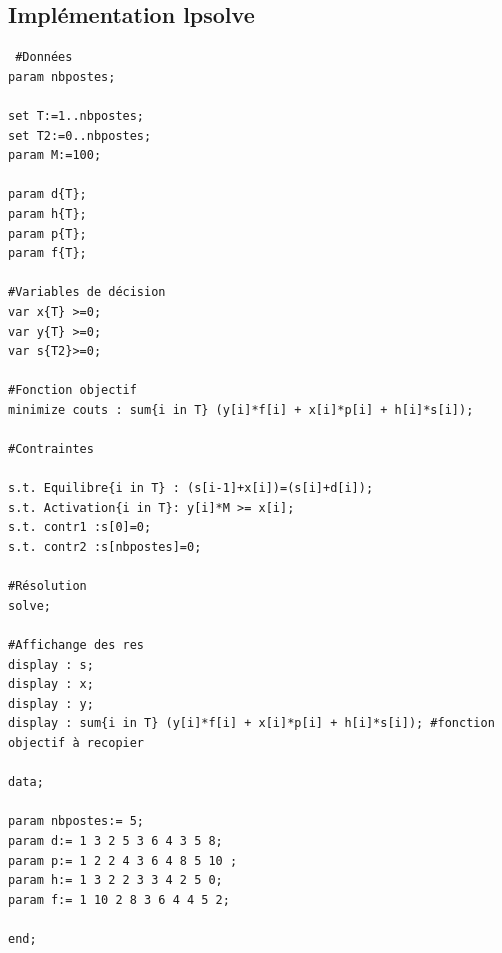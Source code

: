 \documentclass[a4paper,11pt,twoside]{report}
\begin{document}
\begin{appendices}
\chapter{Implémentation lpsolve}
\label{implementationlpsolve}
\begin{verbatim}
 #Données
param nbpostes;

set T:=1..nbpostes;
set T2:=0..nbpostes;
param M:=100;

param d{T};
param h{T};
param p{T};
param f{T};

#Variables de décision
var x{T} >=0;
var y{T} >=0;
var s{T2}>=0;

#Fonction objectif
minimize couts : sum{i in T} (y[i]*f[i] + x[i]*p[i] + h[i]*s[i]);

#Contraintes

s.t. Equilibre{i in T} : (s[i-1]+x[i])=(s[i]+d[i]);
s.t. Activation{i in T}: y[i]*M >= x[i];
s.t. contr1 :s[0]=0;
s.t. contr2 :s[nbpostes]=0;

#Résolution
solve;

#Affichange des res
display : s;
display : x;
display : y;
display : sum{i in T} (y[i]*f[i] + x[i]*p[i] + h[i]*s[i]); #fonction objectif à recopier

data;

param nbpostes:= 5;
param d:= 1 3 2 5 3 6 4 3 5 8;
param p:= 1 2 2 4 3 6 4 8 5 10 ;
param h:= 1 3 2 2 3 3 4 2 5 0;
param f:= 1 10 2 8 3 6 4 4 5 2;

end;
\end{verbatim}
\end{appendices}
\end{document}
